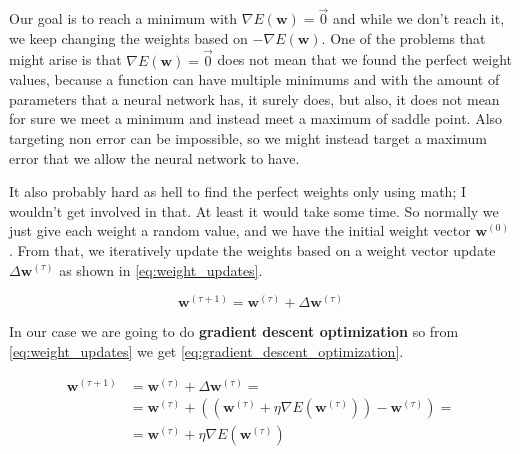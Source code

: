 \documentclass[a4paper,12pt]{article}
\theoremstyle{mytheoremstyle}
\theoremstyle{mytheoremstyle}
\theoremstyle{myproblemstyle}
\begin{document}
    Our goal is to reach a minimum with $ \nabla E \left( \mathbf{w} \right) =
    \vec{0} $ and while we don't reach it, we keep changing the weights based
    on $ -\nabla E \left( \mathbf{w} \right) $. One of the problems that might
    arise is that $ \nabla E \left( \mathbf{w} \right) = \vec{0} $ does not
    mean that we found the perfect weight values, because a function can have
    multiple minimums and with the amount of parameters that a neural network
    has, it surely does, but also, it does not mean for sure we meet a minimum
    and instead meet a maximum of saddle point. Also targeting non error can be
    impossible, so we might instead target a maximum error that we allow the
    neural network to have.

    It also probably hard as hell to find the perfect weights only using math;
    I wouldn't get involved in that. At least it would take some time. So
    normally we just give each weight a random value, and we have the initial
    weight vector $ \mathbf{w}^{\left( 0 \right)} $. From that, we iteratively
    update the weights based on a weight vector update $ \Delta
    \mathbf{w}^{\left( \tau \right)} $ as shown in \eqref{eq:weight_updates}.

    \begin{equation}
        \mathbf{w}^{\left( \tau + 1 \right)} = \mathbf{w}^{\left( \tau \right)} + \Delta \mathbf{w}^{\left( \tau \right)}
        \label{eq:weight_updates}
    \end{equation}

    In our case we are going to do \textbf{gradient descent optimization} so
    from \eqref{eq:weight_updates} we get
    \eqref{eq:gradient_descent_optimization}.

    \begin{equation}
        \begin{split}
            \mathbf{w}^{\left( \tau + 1 \right)} & = \mathbf{w}^{\left( \tau \right)} + \Delta \mathbf{w}^{\left( \tau \right)} = \\
            & = \mathbf{w}^{\left( \tau \right)} + \left( \left( \mathbf{w}^{\left( \tau \right)} + \eta \nabla E \left( \mathbf{w}^{\left( \tau \right)} \right) \right) - \mathbf{w}^{\left( \tau \right)} \right) = \\
            & = \mathbf{w}^{\left( \tau \right)} + \eta \nabla E \left( \mathbf{w}^{\left( \tau \right)} \right)
        \end{split}
        \label{eq:gradient_descent_optimization}
    \end{equation}
\end{document}
